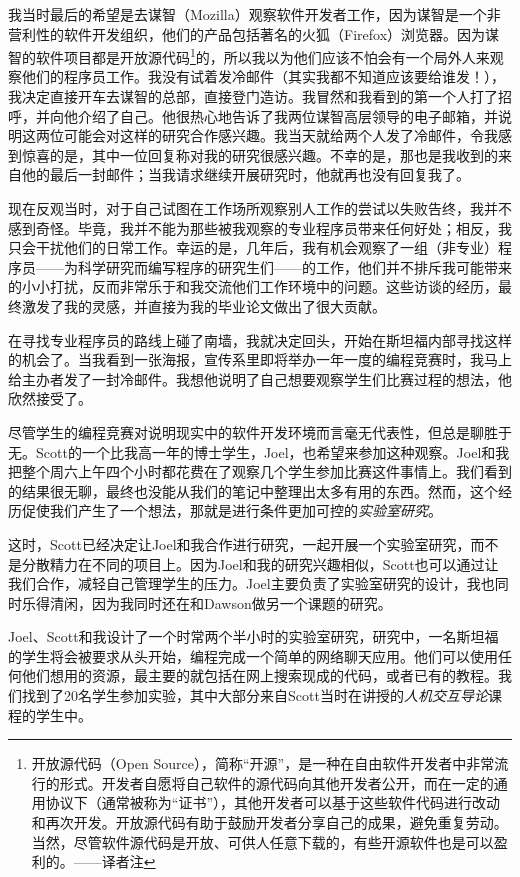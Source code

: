 \documentclass[letter,12pt]{book}
\begin{document}
\begin{CJK}{UTF8}{gbsn}
我当时最后的希望是去谋智（Mozilla）观察软件开发者工作，因为谋智是一个非营利性的软件开发组织，他们的产品包括著名的火狐（Firefox）浏览器。因为谋智的软件项目都是开放源代码\footnote{开放源代码（Open Source），简称“开源”，是一种在自由软件开发者中非常流行的形式。开发者自愿将自己软件的源代码向其他开发者公开，而在一定的通用协议下（通常被称为“证书”），其他开发者可以基于这些软件代码进行改动和再次开发。开放源代码有助于鼓励开发者分享自己的成果，避免重复劳动。当然，尽管软件源代码是开放、可供人任意下载的，有些开源软件也是可以盈利的。——译者注}的，所以我以为他们应该不怕会有一个局外人来观察他们的程序员工作。我没有试着发冷邮件（其实我都不知道应该要给谁发！），我决定直接开车去谋智的总部，直接登门造访。我冒然和我看到的第一个人打了招呼，并向他介绍了自己。他很热心地告诉了我两位谋智高层领导的电子邮箱，并说明这两位可能会对这样的研究合作感兴趣。我当天就给两个人发了冷邮件，令我感到惊喜的是，其中一位回复称对我的研究很感兴趣。不幸的是，那也是我收到的来自他的最后一封邮件；当我请求继续开展研究时，他就再也没有回复我了。

现在反观当时，对于自己试图在工作场所观察别人工作的尝试以失败告终，我并不感到奇怪。毕竟，我并不能为那些被我观察的专业程序员带来任何好处；相反，我只会干扰他们的日常工作。幸运的是，几年后，我有机会观察了一组（非专业）程序员——为科学研究而编写程序的研究生们——的工作，他们并不排斥我可能带来的小小打扰，反而非常乐于和我交流他们工作环境中的问题。这些访谈的经历，最终激发了我的灵感，并直接为我的毕业论文做出了很大贡献。

\breakline

在寻找专业程序员的路线上碰了南墙，我就决定回头，开始在斯坦福内部寻找这样的机会了。当我看到一张海报，宣传系里即将举办一年一度的编程竞赛时，我马上给主办者发了一封冷邮件。我想他说明了自己想要观察学生们比赛过程的想法，他欣然接受了。

尽管学生的编程竞赛对说明现实中的软件开发环境而言毫无代表性，但总是聊胜于无。Scott的一个比我高一年的博士学生，Joel，也希望来参加这种观察。Joel和我把整个周六上午四个小时都花费在了观察几个学生参加比赛这件事情上。我们看到的结果很无聊，最终也没能从我们的笔记中整理出太多有用的东西。然而，这个经历促使我们产生了一个想法，那就是进行条件更加可控的\emph{实验室研究}。

这时，Scott已经决定让Joel和我合作进行研究，一起开展一个实验室研究，而不是分散精力在不同的项目上。因为Joel和我的研究兴趣相似，Scott也可以通过让我们合作，减轻自己管理学生的压力。Joel主要负责了实验室研究的设计，我也同时乐得清闲，因为我同时还在和Dawson做另一个课题的研究。

Joel、Scott和我设计了一个时常两个半小时的实验室研究，研究中，一名斯坦福的学生将会被要求从头开始，编程完成一个简单的网络聊天应用。他们可以使用任何他们想用的资源，最主要的就包括在网上搜索现成的代码，或者已有的教程。我们找到了20名学生参加实验，其中大部分来自Scott当时在讲授的\emph{人机交互导论}课程的学生中。


\end{CJK}
\end{document}
